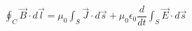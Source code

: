 \documentclass[preview]{standalone}
\begin{document}
\begin{align*}
\oint_C \vec{B}\cdot d
                    \vec{l}=\mu_0\int_S \vec{J}
                    \cdot d \vec{s}+\mu_0
                    \epsilon_0\dfrac{d}{dt}
                    \int_S \vec{E}\cdot d \vec{s}
\end{align*}
\end{document}
